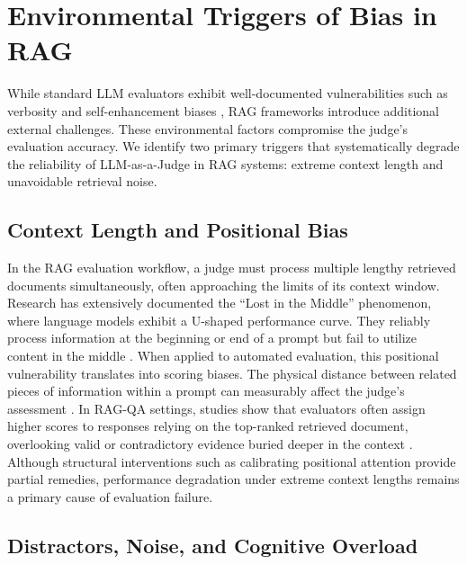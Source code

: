 \section{Environmental Triggers of Bias in RAG}
\label{sec:triggers}

While standard LLM evaluators exhibit well-documented vulnerabilities such as verbosity and self-enhancement biases \citep{wang2023fair}, RAG frameworks introduce additional external challenges. These environmental factors compromise the judge's evaluation accuracy. We identify two primary triggers that systematically degrade the reliability of LLM-as-a-Judge in RAG systems: extreme context length and unavoidable retrieval noise.

\subsection{Context Length and Positional Bias}

In the RAG evaluation workflow, a judge must process multiple lengthy retrieved documents simultaneously, often approaching the limits of its context window. Research has extensively documented the ``Lost in the Middle'' phenomenon, where language models exhibit a U-shaped performance curve. They reliably process information at the beginning or end of a prompt but fail to utilize content in the middle \citep{lostinthemiddle2023}. When applied to automated evaluation, this positional vulnerability translates into scoring biases. The physical distance between related pieces of information within a prompt can measurably affect the judge's assessment \citep{distance2024}. In RAG-QA settings, studies show that evaluators often assign higher scores to responses relying on the top-ranked retrieved document, overlooking valid or contradictory evidence buried deeper in the context \citep{ragqa2024, posbias2025}. Although structural interventions such as calibrating positional attention \citep{foundinmiddle2024} provide partial remedies, performance degradation under extreme context lengths remains a primary cause of evaluation failure.

\subsection{Distractors, Noise, and Cognitive Overload}

